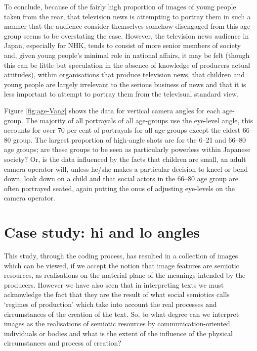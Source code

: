 To conclude, because of the fairly high proportion of images of young people taken from the rear, that television news is attempting to portray them in such a manner that the audience consider themselves somehow disengaged from this age-group seems to be overstating the case. However, the television news audience in Japan, especially for NHK, tends to consist of more senior members of society and, given young people's minimal role in national affairs, it may be felt (though this can be little but speculation in the absence of knowledge of producers actual attitudes), within organisations that produce television news, that children and young people are largely irrelevant to the serious business of news and that it is less important to attempt to portray them from the televisual standard view.

Figure \ref{fig:age-Vang} shows the data for vertical camera angles for each age-group. The majority of all portrayals of all age-groups use the eye-level angle, this accounts for over 70 per cent of portrayals for all age-groups except the eldest 66--80 group. The largest proportion of high-angle shots are for the 6--21 and 66--80 age groups; are these groups to be seen as particularly powerless within Japanese society? Or, is the data influenced by the facts that children are small, an adult camera operator will, unless he/she makes a particular decision to kneel or bend down, look down on a child and that social actors in the 66--80 age group are often portrayed seated, again putting the onus of adjusting eye-levels on the camera operator.

\section{Case study: hi and lo angles}\label{cs:angles}
This study, through the coding process, has resulted in a collection of images which can be viewed, if we accept the notion that image features are semiotic resources, as realisations on the material plane of the meanings intended by the producers. However we have also seen that in interpreting texts we must acknowledge the fact that they are the result of what social semiotics calls `regimes of production' which take into account the real processes and circumstances of the creation of the text. So, to what degree can we interpret images as the realisations of semiotic resources by communication-oriented individuals or bodies and what is the extent of the influence of the physical circumstances and process of creation? 

